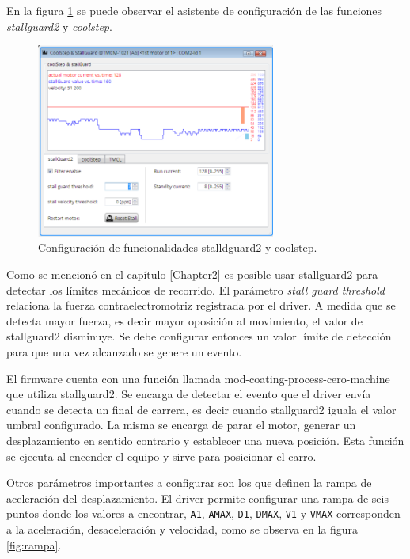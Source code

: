 En la figura \ref{fig:tmcl_ide_stall} se puede observar el asistente de configuración de las funciones \textit{stallguard2} y \textit{coolstep}.

\begin{figure}[h!]
	\centering
	\includegraphics[width=0.7\textwidth]{./Figures/tmcl_ide_2.png}
	\caption{Configuración de funcionalidades stalldguard2 y coolstep.}
	\label{fig:tmcl_ide_stall}
\end{figure}

Como se mencionó en el capítulo \ref{Chapter2} es posible usar stallguard2 para detectar los límites mecánicos de recorrido. El parámetro \textit{stall guard threshold} relaciona la fuerza contraelectromotriz registrada por el driver. A medida que se detecta mayor fuerza, es decir mayor oposición al movimiento, el valor de stallguard2 disminuye. Se debe configurar entonces un valor límite de detección para que una vez alcanzado se genere un evento.

El firmware cuenta con una función llamada mod-coating-process-cero-machine que utiliza stallguard2. Se encarga de detectar el evento que el driver envía cuando se detecta un final de carrera, es decir cuando stallguard2 iguala el valor umbral configurado. La misma se encarga de parar el motor, generar un desplazamiento en sentido contrario y establecer una nueva posición. Esta función se ejecuta al encender el equipo y sirve para posicionar el carro.
 



Otros parámetros importantes a configurar son los que definen la rampa de aceleración del desplazamiento. El driver permite configurar una rampa de seis puntos donde los valores a encontrar, \texttt{A1}, \texttt{AMAX}, \texttt{D1}, \texttt{DMAX}, \texttt{V1} y \texttt{VMAX} corresponden a la aceleración, desaceleración y velocidad, como se observa en la figura \ref{fig:rampa}.

